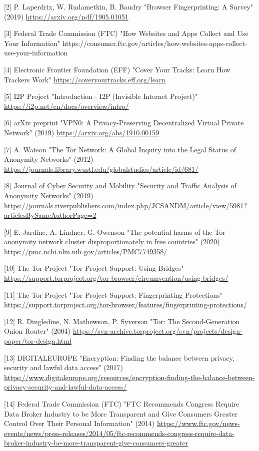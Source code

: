 \documentclass[
]{article}
\begin{document}
{[}2{]} P. Laperdrix, W. Rudametkin, B. Baudry "Browser Fingerprinting:
A Survey" (2019) \url{https://arxiv.org/pdf/1905.01051}

{[}3{]} Federal Trade Commission (FTC) "How Websites and Apps Collect
and Use Your Information"
https://consumer.ftc.gov/articles/how-websites-apps-collect-use-your-information

{[}4{]} Electronic Frontier Foundation (EFF) "Cover Your Tracks: Learn
How Trackers Work" \url{https://coveryourtracks.eff.org/learn}

{[}5{]} I2P Project "Introduction - I2P (Invisible Internet Project)"
\url{https://i2p.net/en/docs/overview/intro/}

{[}6{]} arXiv preprint "VPN0: A Privacy-Preserving Decentralized Virtual
Private Network" (2019) \url{https://arxiv.org/abs/1910.00159}

{[}7{]} A. Watson "The Tor Network: A Global Inquiry into the Legal
Status of Anonymity Networks" (2012)
\url{https://journals.library.wustl.edu/globalstudies/article/id/681/}

{[}8{]} Journal of Cyber Security and Mobility "Security and Traffic
Analysis of Anonymity Networks" (2019)
\url{https://journals.riverpublishers.com/index.php/JCSANDM/article/view/5981?articlesBySameAuthorPage=2}

{[}9{]} E. Jardine, A. Lindner, G. Owenson "The potential harms of the
Tor anonymity network cluster disproportionately in free countries"
(2020) \url{https://pmc.ncbi.nlm.nih.gov/articles/PMC7749358/}

{[}10{]} The Tor Project "Tor Project Support: Using Bridges"
\url{https://support.torproject.org/tor-browser/circumvention/using-bridges/}

{[}11{]} The Tor Project "Tor Project Support: Fingerprinting
Protections"
\url{https://support.torproject.org/tor-browser/features/fingerprinting-protections/}

{[}12{]} R. Dingledine, N. Mathewson, P. Syverson "Tor: The
Second-Generation Onion Router" (2004)
\url{https://svn-archive.torproject.org/svn/projects/design-paper/tor-design.html}

{[}13{]} DIGITALEUROPE "Encryption: Finding the balance between privacy,
security and lawful data access" (2017)
\url{https://www.digitaleurope.org/resources/encryption-finding-the-balance-between-privacy-security-and-lawful-data-access/}

{[}14{]} Federal Trade Commission (FTC) "FTC Recommends Congress Require
Data Broker Industry to be More Transparent and Give Consumers Greater
Control Over Their Personal Information" (2014)
\url{https://www.ftc.gov/news-events/news/press-releases/2014/05/ftc-recommends-congress-require-data-broker-industry-be-more-transparent-give-consumers-greater}
\end{document}
